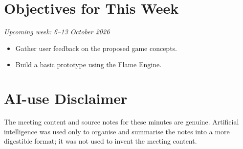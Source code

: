 \documentclass[12pt,a4paper]{article}
\begin{document}
\section{Objectives for This Week}

\noindent\textit{Upcoming week: 6--13 October 2026}
\begin{itemize}[leftmargin=*]
    \item Gather user feedback on the proposed game concepts.
    \item Build a basic prototype using the Flame Engine.
\end{itemize}

\section*{\small AI-use Disclaimer}
\small The meeting content and source notes for these minutes are genuine. Artificial intelligence was used only to organise and summarise the notes into a more digestible format; it was not used to invent the meeting content.
\end{document}
